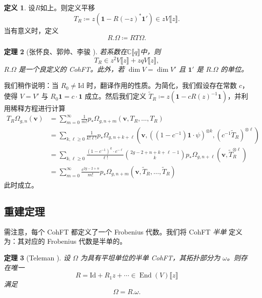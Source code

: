 \documentclass{amsart}
\newtheorem{thm}{定理}[section]
\theoremstyle{definition}
\newtheorem{defn}[thm]{定义}
\theoremstyle{remark}
\theoremstyle{plain}
\theoremstyle{definition}
\theoremstyle{remark}
\newcommand{\C}{\mathbb{C}}
\newcommand{\mbf}[1]{\mathbf{#1}}
\newcommand{\bv}{\mbf{v}}
\newcommand{\mr}[1]{\mathrm{#1}}
\newcommand{\1}{\mathbf{1}}
\newcommand{\2}{\mathbf{2}}
\newcommand{\3}{\mathbf{3}}
\newcommand{\ps}[1]{\llbracket #1 \rrbracket}
\DeclareMathOperator{\End}{End}
\begin{document}
\begin{defn}
设$R$如上。则定义平移
    \[ T_R \coloneqq z (\1 - R(-z)^* \1') \in z V\ps{z}. \]
当有意义时，定义
    \[ R.\Omega \coloneqq RT\Omega. \]
\end{defn}

\begin{thm}[张怀良、郭帅、李骏 {\cite[定理~2.7]{CGL2026}}]
若系数在$\C\ps{q}$中，则
    \[ T_R \in z^2 V \ps{z} + zq V \ps{z}, \]
$R.\Omega$ 是一个良定义的 CohFT。此外，若 $\dim V = \dim V'$ 且 $\1'$ 是 $R.\Omega$ 的单位。
\end{thm}

我们稍作说明：当 $R_0 \neq \mr{Id}$ 时，翻译作用的性质。为简化，我们假设存在常数 $c$，使得 $V = V'$ 与 $R_0 \1 = c \cdot \1$ 成立。然后我们定义 $\tilde{T}_R \coloneqq z( \1 - c R(z)^{-1} \1)$，并利用稀释方程进行计算
\begin{align*}
    T_R \Omega_{g,n}(\bv) &= \sum_{m=0}^{\infty} \frac{1}{m!} p_*\Omega_{g,n+m}(\bv, T_R, \ldots, T_R) \\
    &= \sum_{k,\ell \geq 0} \frac{1}{k!\ell!} p_* \Omega_{g,n+k+\ell}(\bv, ( (1-c^{-1})\1 \cdot \psi )^{\otimes k}, ( c^{-1} \tilde{T}_R )^{\otimes \ell}) \\
    &= \sum_{k,\ell \geq 0} \frac{(1-c^{-1})^k \cdot c^{-\ell}}{\ell!} \binom{2g-2+n+k+\ell-1}{k} p_* \Omega_{g,n+\ell}(\bv, \tilde{T}_R^{\otimes \ell}) \\
    &= \sum_{m=0}^{\infty} \frac{c^{2g-2+n}}{m!} p_* \Omega_{g,n+m}(\bv, \tilde{T}_R, \ldots, \tilde{T}_R)
\end{align*}
此时成立。


\subsection{重建定理}%
\label{sub:Reconstruction theorem}

需注意，每个 CohFT 都定义了一个 Frobenius 代数。我们将 CohFT \textit{半单} 定义为：其对应的 Frobenius 代数是半单的。

\begin{thm}[Teleman {\cite{Teleman2012}}]%
\label{thm:teleman}
设 $\Omega$ 为具有平坦单位的半单 CohFT，其拓扑部分为 $\omega$。则存在唯一
    \[ R = \mr{Id} + R_1 z + \cdots \in \End(V)\ps{z} \]
满足
    \[ \Omega = R.\omega. \]
\end{thm}
\end{document}

